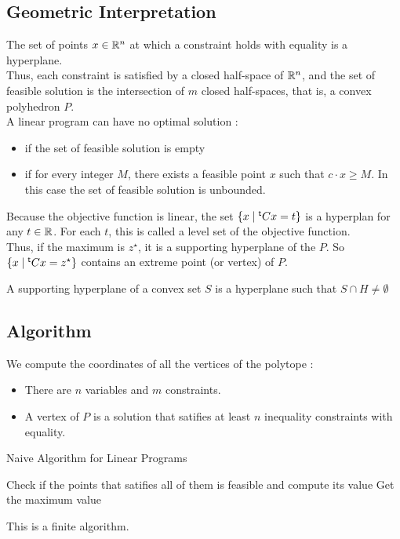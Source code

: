 \documentclass[12pt]{cours}
\begin{document}
\subsection{Geometric Interpretation}
The set of points $x \in \mathbb{R}^{n}$ at which a constraint holds with equality is a hyperplane. \\
Thus, each constraint is satisfied by a closed half-space of $\mathbb{R}^{n}$, and the set of feasible solution is the intersection of $m$ closed half-spaces, that is, a convex polyhedron $P$. \\
A linear program can have no optimal solution :
\begin{itemize}
    \item if the set of feasible solution is empty
    \item if for every integer $M$, there exists a feasible point $x$ such that $c \cdot x \geq M$. In this case the set of feasible solution is unbounded.
\end{itemize}
\begin{proposition}
    Because the objective function is linear, the set $\{x \mid {^{\mathsf{t}}}Cx = t\}$ is a hyperplan for any $t \in \mathbb{R}$. For each $t$, this is called a level set of the objective function. \\
    Thus, if the maximum is $z^{\star}$, it is a supporting hyperplane of the $P$. So $\{x \mid {^{\mathsf{t}}}Cx = z^{\star}\}$ contains an extreme point (or vertex) of $P$.
\end{proposition}

\begin{definition}
    A supporting hyperplane of a convex set $S$ is a hyperplane such that $S \cap H \neq \emptyset$
\end{definition}

\subsection{Algorithm}
We compute the coordinates of all the vertices of the polytope :
\begin{itemize}
    \item There are $n$ variables and $m$ constraints.
    \item A vertex of $P$ is a solution that satifies at least $n$ inequality constraints with equality.
\end{itemize}
\begin{algorithm}
    \caption{Naive Algorithm for Linear Programs}
    \begin{algorithmic}
            \State Check if the points that satifies all of them is feasible and compute its value
        \EndFor
        \State Get the maximum value
    \end{algorithmic}
\end{algorithm}
This is a finite algorithm.
\end{document}
